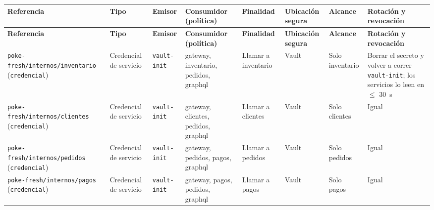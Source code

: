 \begin{landscape}
\vspace{0.6em}
{\scriptsize
\setlength{\LTpre}{0pt}\setlength{\LTpost}{0pt}
\setlength{\tabcolsep}{3pt}\renewcommand{\arraystretch}{1.15}
\begin{longtable}{|>{\raggedright\arraybackslash}p{}|>{\raggedright\arraybackslash}p{}|>{\raggedright\arraybackslash}p{}|>{\raggedright\arraybackslash}p{}|>{\raggedright\arraybackslash}p{}|>{\raggedright\arraybackslash}p{}|>{\raggedright\arraybackslash}p{}|>{\raggedright\arraybackslash}p{}|}
\hline
\textbf{Referencia} & \textbf{Tipo} & \textbf{Emisor} & \textbf{Consumidor (política)} & \textbf{Finalidad} & \textbf{Ubicación segura} & \textbf{Alcance} & \textbf{Rotación y revocación} \\ \hline
\endfirsthead
\hline
\textbf{Referencia} & \textbf{Tipo} & \textbf{Emisor} & \textbf{Consumidor (política)} & \textbf{Finalidad} & \textbf{Ubicación segura} & \textbf{Alcance} & \textbf{Rotación y revocación} \\ \hline
\endhead
\texttt{poke-\allowbreak{}fresh/\allowbreak{}internos/\allowbreak{}inventario} (\texttt{credencial}) & Credencial de servicio & \texttt{vault-\allowbreak{}init} & gateway, inventario, pedidos, graphql & Llamar a inventario & Vault & Solo inventario & Borrar el secreto y volver a correr \texttt{vault-\allowbreak{}init}; los servicios lo leen en $\leq$ 30~s \\ \hline
\texttt{poke-\allowbreak{}fresh/\allowbreak{}internos/\allowbreak{}clientes} (\texttt{credencial}) & Credencial de servicio & \texttt{vault-\allowbreak{}init} & gateway, clientes, pedidos, graphql & Llamar a clientes & Vault & Solo clientes & Igual \\ \hline
\texttt{poke-\allowbreak{}fresh/\allowbreak{}internos/\allowbreak{}pedidos} (\texttt{credencial}) & Credencial de servicio & \texttt{vault-\allowbreak{}init} & gateway, pedidos, pagos, graphql & Llamar a pedidos & Vault & Solo pedidos & Igual \\ \hline
\texttt{poke-\allowbreak{}fresh/\allowbreak{}internos/\allowbreak{}pagos} (\texttt{credencial}) & Credencial de servicio & \texttt{vault-\allowbreak{}init} & gateway, pagos, pedidos, graphql & Llamar a pagos & Vault & Solo pagos & Igual \\ \hline

\end{longtable}}
\end{landscape}
